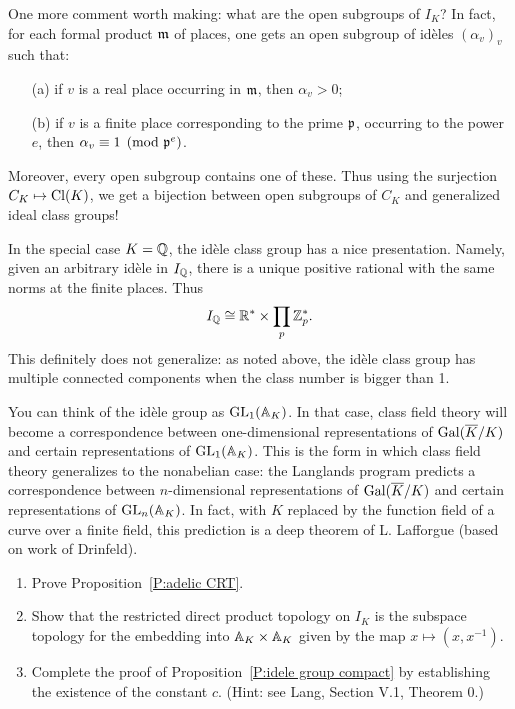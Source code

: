 One more comment worth making: what are the open subgroups of $I_K$?
In fact, for each formal product $\gothm$ of places, one gets an open
subgroup of id\`eles $(\alpha_v)_v$ such that:
\begin{enumerate}
\item[(a)] if $v$ is a real place occurring in $\gothm$, then
$\alpha_v > 0$;
\item[(b)] if $v$ is a finite place corresponding to the prime $\gothp$,
occurring to the power $e$, then $\alpha_v \equiv 1 \pmod{\gothp^e}$.
\end{enumerate}
Moreover, every open subgroup contains one of these. Thus
using the surjection $C_K \mapsto \Cl(K)$, we get a bijection between open
subgroups of $C_K$ and generalized ideal class groups!

In the special case $K = \QQ$, the id\`ele class group has a nice presentation.
Namely, given an arbitrary id\`ele in $I_\QQ$, there is a unique positive
rational with the same norms at the finite places. Thus
\[
I_\QQ \cong \RR^* \times \prod_p \ZZ_p^*.
\]
This definitely does not generalize: as noted above, the id\`ele class group
has multiple connected components when the class number is bigger than 1.

You can think of the id\`ele group as $\GL_1(\AA_K)$. In that case, class field
theory will become a correspondence between one-dimensional representations
of $\Gal(\overline{K}/K)$ and certain representations of $\GL_1(\AA_K)$. This
is the form in which class field theory generalizes to the nonabelian case:
the Langlands program predicts a correspondence between $n$-dimensional
representations of $\Gal(\overline{K}/K)$ and certain representations
of $\GL_n(\AA_K)$. In fact, with $K$ replaced by the function field of a
curve over a finite field, this prediction is a deep theorem of L. Lafforgue
(based on work of Drinfeld).


\begin{enumerate}
\item
Prove Proposition~\ref{P:adelic CRT}.
\item
Show that the restricted direct product topology on $I_K$ is the subspace topology for the embedding into
$\AA_K \times \AA_K$ given by the map $x \mapsto (x,x^{-1})$.
\item
Complete the proof of Proposition~\ref{P:idele group compact} by establishing the existence of the constant $c$. (Hint: see Lang, Section V.1, Theorem 0.)
\end{enumerate}

%
